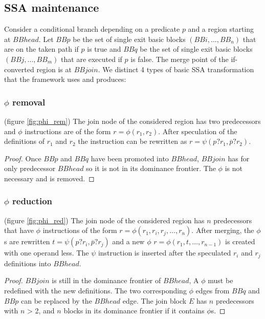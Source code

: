 \subsection{SSA maintenance}

Consider a conditional branch depending on a predicate $p$ and a region starting at $BBhead$. Let $BBp$ be the set of single exit basic blocks $(BBi,\dots,BB_n)$ that are on the taken path if $p$ is true and $BBq$ be the set of single exit basic blocks $(BBj,\dots,BB_m)$ that are executed if $p$ is false. The merge point of the if-converted region is at $BBjoin$. We distinct 4 types of basic SSA transformation that the framework uses and produces:
\subsubsection{$\phi$ removal} (figure \ref{fig:phi_rem})
The join node of the considered region has two predecessors and $\phi$ instructions are of the form $r=\phi(r_1,r_2)$. After speculation of the definitions of $r_1$ and $r_2$ the instruction can be rewritten as $r=\psi(p?r_1,\overline{p}?r_2)$.
\begin{proof} Once $BBp$ and $BBq$ have been promoted into $BBhead$, $BBjoin$ has for only predecessor $BBhead$ so it is not in its dominance frontier. The $\phi$ is not necessary and is removed.
\end{proof}
\subsubsection{$\phi$ reduction} (figure \ref{fig:phi_red})
 The join node of the considered region has $n$ predecessors that have $\phi$ instructions of the form $r=\phi(r_1,r_i,r_j,\dots,r_n)$. After merging, the $\phi$s are rewritten $t=\psi(p?r_i,\overline{p}?r_j)$ and a new $\phi$ $r=\phi(r_1,t,\dots,r_{n-1})$ is created with one operand less. The $\psi$ instruction is inserted after the speculated $r_i$ and $r_j$ definitions into $BBhead$.
\begin{proof} $BBjoin$ is still in the dominance frontier of $BBhead$, A $\phi$ must be redefined with the new definitions. The two corresponding $\phi$ edges from $BBq$ and $BBp$ can be replaced by the $BBhead$ edge.
The join block $E$ has $n$ predecessors with $n$ > 2, and $n$ blocks in its dominance frontier if it contains $\phi$s.
\end{proof}

